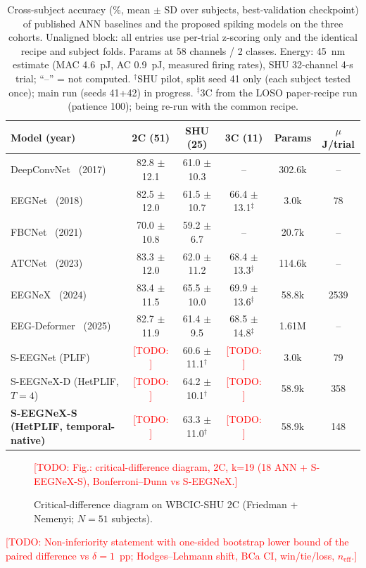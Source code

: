 \documentclass{article}
\newcommand{\todo}[1]{\textcolor{red}{[TODO: #1]}}
\begin{document}
\begin{table}[t]
  \centering
  \caption{Cross-subject accuracy (\%, mean $\pm$ SD over subjects, best-validation checkpoint) of published ANN baselines and the proposed spiking models on the three cohorts. Unaligned block: all entries use per-trial z-scoring only and the identical recipe and subject folds. Params at 58 channels / 2 classes. Energy: 45~nm estimate (MAC 4.6~pJ, AC 0.9~pJ, measured firing rates), SHU 32-channel 4-s trial; ``--'' = not computed. $^\dagger$SHU pilot, split seed 41 only (each subject tested once); main run (seeds 41+42) in progress. $^\ddagger$3C from the LOSO paper-recipe run (patience 100); being re-run with the common recipe.}
  \label{tab:main}
  \small
  \begin{tabular}{lccccc}
    \toprule
    Model (year) & 2C (51) & SHU (25) & 3C (11) & Params & $\mu$J/trial \\
    \midrule
    DeepConvNet~\cite{schirrmeister2017deep} (2017) & 82.8 $\pm$ 12.1 & 61.0 $\pm$ 10.3 & -- & 302.6k & -- \\
    EEGNet~\cite{lawhern2018eegnet} (2018) & 82.5 $\pm$ 12.0 & 61.5 $\pm$ 10.7 & 66.4 $\pm$ 13.1$^\ddagger$ & 3.0k & 78 \\
    FBCNet~\cite{mane2021fbcnet} (2021) & 70.0 $\pm$ 10.8 & 59.2 $\pm$ 6.7 & -- & 20.7k & -- \\
    ATCNet~\cite{altaheri2023atcnet} (2023) & 83.3 $\pm$ 12.0 & 62.0 $\pm$ 11.2 & 68.4 $\pm$ 13.3$^\ddagger$ & 114.6k & -- \\
    EEGNeX~\cite{chen2024eegnex} (2024) & 83.4 $\pm$ 11.5 & 65.5 $\pm$ 10.0 & 69.9 $\pm$ 13.6$^\ddagger$ & 58.8k & 2539 \\
    EEG-Deformer~\cite{ding2025deformer} (2025) & 82.7 $\pm$ 11.9 & 61.4 $\pm$ 9.5 & 68.5 $\pm$ 14.8$^\ddagger$ & 1.61M & -- \\
    \midrule
    S-EEGNet (PLIF) & \todo{} & 60.6 $\pm$ 11.1$^\dagger$ & \todo{} & 3.0k & 79 \\
    S-EEGNeX-D (HetPLIF, $T{=}4$) & \todo{} & 64.2 $\pm$ 10.1$^\dagger$ & \todo{} & 58.9k & 358 \\
    \textbf{S-EEGNeX-S (HetPLIF, temporal-native)} & \todo{} & 63.3 $\pm$ 11.0$^\dagger$ & \todo{} & 58.9k & 148 \\
    \bottomrule
  \end{tabular}
\end{table}
\begin{figure}[t]
  \centering
  \todo{Fig.: critical-difference diagram, 2C, k=19 (18 ANN + S-EEGNeX-S), Bonferroni–Dunn vs S-EEGNeX.}
  \caption{Critical-difference diagram on WBCIC-SHU 2C (Friedman + Nemenyi; $N{=}51$ subjects).}
  \label{fig:cd}
\end{figure}
\todo{Non-inferiority statement with one-sided bootstrap lower bound of the paired difference vs $\delta = 1$~pp; Hodges–Lehmann shift, BCa CI, win/tie/loss, $n_{\mathrm{eff}}$.}
\end{document}
